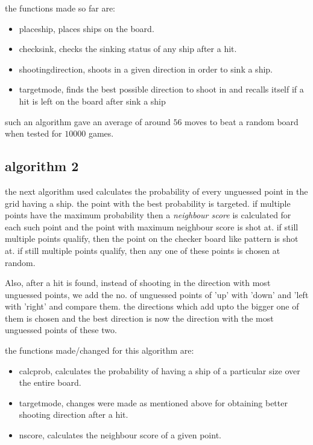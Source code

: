 \documentclass{article}
\begin{document}
	the functions made so far are:
	\begin{itemize}
   		
   		\item placeship, places ships on the board.
   		\item checksink, checks the sinking status of any ship after a hit.
   		\item shootingdirection, shoots in a given direction in order to sink a ship.
   		\item targetmode, finds the best possible direction to shoot in and recalls itself if a hit is left on the board after sink a ship
	
	\end{itemize}
	
	such an algorithm gave an average of around $56$ moves to beat a random board when tested for $10000$ games.
	
	\subsection{algorithm 2}
	
	the next algorithm used calculates the probability of every unguessed point in the grid having a ship. the point with the best probability is targeted. if multiple points have the maximum probability then a \textit{neighbour score} is calculated for each such point and the point with maximum neighbour score is shot at. if still multiple points qualify, then the point on the checker board like pattern is shot at. if still multiple points qualify, then any one of these points is chosen at random.
	
	Also, after a hit is found, instead of shooting in the direction with most unguessed points, we add the no. of unguessed points of 'up' with 'down' and 'left with 'right' and compare them. the directions which add upto the bigger one of them is chosen and the best direction is now the direction with the most unguessed points of these two.
	
	the functions made/changed for this algorithm are:
	\begin{itemize}
	
		\item calcprob, calculates the probability of having a ship of a particular size over the entire board.
		\item targetmode, changes were made as mentioned above for obtaining better shooting direction after a hit.
		\item nscore, calculates the neighbour score of a given point.
	\end{itemize}
	
\end{document}
